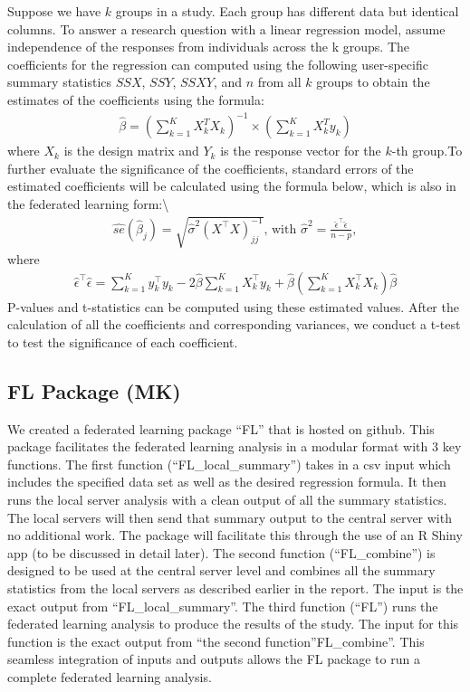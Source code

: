 \documentclass[
]{article}
\begin{document}
Suppose we have \(k\) groups in a study. Each group has different data
but identical columns. To answer a research question with a linear
regression model, assume independence of the responses from individuals
across the k groups. The coefficients for the regression can computed
using the following user-specific summary statistics \(SSX\), \(SSY\),
\(SSXY\), and \(n\) from all \(k\) groups to obtain the estimates of the
coefficients using the formula:\newline \begin{align*}
    \hat{\beta} = (\sum_{k=1}^{K} X^T_kX_k)^{-1}\times(\sum_{k=1}^{K} X^T_ky_k)
\end{align*} where \(X_k\) is the design matrix and \(Y_k\) is the
response vector for the \(k\)-th group.To further evaluate the
significance of the coefficients, standard errors of the estimated
coefficients will be calculated using the formula below, which is also
in the federated learning form:\textbackslash{} \begin{align*}
    \widehat{se}(\widehat{\beta}_j) = \sqrt{\widehat{\sigma}^2(X^\top X)^{-1}_{jj}}\text{, with }\widehat{\sigma}^2 = \frac{\widehat{\epsilon}^\top \widehat{\epsilon}}{n-p},
\end{align*} where \begin{align*}
    \widehat{\epsilon}^\top \widehat{\epsilon}=\sum_{k=1}^K y_k^\top y_k - 2\widehat \beta \sum_{k=1}^K X_k^\top y_k + \widehat\beta \left( \sum_{k=1}^K X_k^\top X_k\right)\widehat\beta
\end{align*} P-values and t-statistics can be computed using these
estimated values. After the calculation of all the coefficients and
corresponding variances, we conduct a t-test to test the significance of
each coefficient.

\hypertarget{fl-package-mk}{%
\subsection{FL Package (MK)}\label{fl-package-mk}}

We created a federated learning package ``FL'' that is hosted on github.
This package facilitates the federated learning analysis in a modular
format with 3 key functions. The first function (``FL\_local\_summary'')
takes in a csv input which includes the specified data set as well as
the desired regression formula. It then runs the local server analysis
with a clean output of all the summary statistics. The local servers
will then send that summary output to the central server with no
additional work. The package will facilitate this through the use of an
R Shiny app (to be discussed in detail later). The second function
(``FL\_combine'') is designed to be used at the central server level and
combines all the summary statistics from the local servers as described
earlier in the report. The input is the exact output from
``FL\_local\_summary''. The third function (``FL'') runs the federated
learning analysis to produce the results of the study. The input for
this function is the exact output from ``the second
function''FL\_combine''. This seamless integration of inputs and outputs
allows the FL package to run a complete federated learning analysis.
\end{document}
